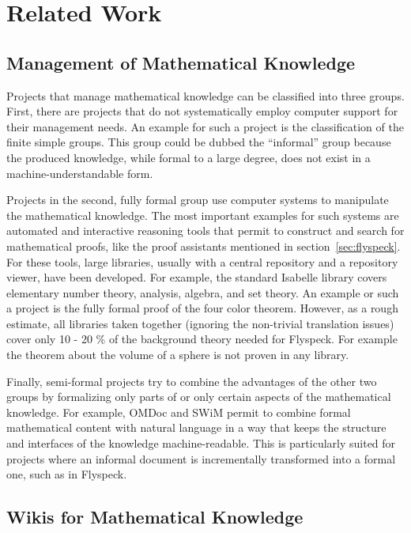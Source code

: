 \section{Related Work}
\label{sec:related}


\subsection{Management of Mathematical Knowledge}
\label{sec:mkm}

Projects that manage mathematical knowledge can be classified into three groups.  First, there are projects that do not systematically employ computer support for their management needs.  An example for such a project is the classification of the finite simple groups\cite{Gorenstein-Lyons-Salomon:1994}.  This group could be dubbed the ``informal'' group because the produced knowledge, while formal to a large degree, does not exist in a machine-understandable form.

Projects in the second, fully formal group use computer systems to manipulate the mathematical knowledge.  The most important examples for such systems are automated and interactive reasoning tools that permit to construct and search for mathematical proofs, like the proof assistants mentioned in section~\ref{sec:flyspeck}.  For these tools, large libraries, usually with a central repository and a repository viewer, have been developed.  For example, the standard Isabelle library covers elementary number theory, analysis, algebra, and set theory. An example or such a project is the fully formal proof of the four color theorem\cite{Gonthier:FourColor}. However, as a rough estimate, all libraries taken together (ignoring the non-trivial translation issues) cover only 10 - 20 \% of the background theory needed for Flyspeck. For example the theorem about the volume of a sphere is not proven in any library.

Finally, semi-formal projects try to combine the advantages of the other two groups by formalizing only parts of or only certain aspects of the mathematical knowledge.  For example, OMDoc and SWiM permit to combine formal mathematical content with natural language in a way that keeps the structure and interfaces of the knowledge machine-readable.  This is particularly suited for projects where an informal document is incrementally transformed into a formal one, such as in Flyspeck.

\subsection{Wikis for Mathematical Knowledge}
\label{sec:math-wiki}

